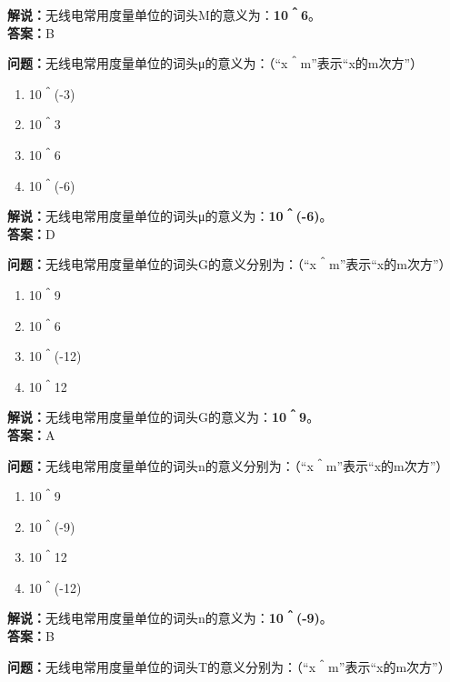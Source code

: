 \documentclass{ctexbook}
\begin{document}
\noindent\textbf{解说：}无线电常用度量单位的词头M的意义为：\textbf{10＾6}。\\\noindent\textbf{答案：}B


\bigskip


\noindent\textbf{问题：}无线电常用度量单位的词头μ的意义为：（“x＾m”表示“x的m次方”）

\begin{enumerate}[label=\Alph*), leftmargin=3em]
	\item 10＾(-3)
	\item 10＾3
	\item 10＾6
	\item 10＾(-6)
\end{enumerate}

\noindent\textbf{解说：}无线电常用度量单位的词头μ的意义为：\textbf{10＾(-6)}。\\\noindent\textbf{答案：}D


\bigskip


\noindent\textbf{问题：}无线电常用度量单位的词头G的意义分别为：（“x＾m”表示“x的m次方”）

\begin{enumerate}[label=\Alph*), leftmargin=3em]
	\item 10＾9
	\item 10＾6
	\item 10＾(-12)
	\item 10＾12
\end{enumerate}

\noindent\textbf{解说：}无线电常用度量单位的词头G的意义为：\textbf{10＾9}。\\\noindent\textbf{答案：}A


\bigskip


\noindent\textbf{问题：}无线电常用度量单位的词头n的意义分别为：（“x＾m”表示“x的m次方”）

\begin{enumerate}[label=\Alph*), leftmargin=3em]
	\item 10＾9
	\item 10＾(-9)
	\item 10＾12
	\item 10＾(-12)
\end{enumerate}

\noindent\textbf{解说：}无线电常用度量单位的词头n的意义为：\textbf{10＾(-9)}。\\\noindent\textbf{答案：}B


\bigskip


\noindent\textbf{问题：}无线电常用度量单位的词头T的意义分别为：（“x＾m”表示“x的m次方”）
\end{document}
